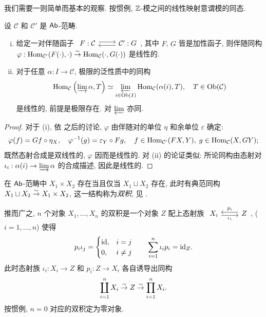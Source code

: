 我们需要一则简单而基本的观察. 按惯例, $\mathbb{Z}$-模之间的线性映射意谓模的同态.

\begin{proposition}\label{prop:automatic-Ab-morphism}
	设 $\mathcal{C}$ 和 $\mathcal{C}'$ 是 $\mathsf{Ab}$-范畴.
	\begin{enumerate}[(i)]
		\item 给定一对伴随函子
		$\begin{tikzcd}
			F: \mathcal{C} \arrow[shift left, r] & \mathcal{C}' \arrow[shift left, l] : G
		\end{tikzcd}$,
		其中 $F$, $G$ 皆是加性函子, 则伴随同构 $\varphi: \operatorname{Hom}_{\mathcal{C}'}(F(\cdot), \cdot) \stackrel{\sim}{\rightarrow} \operatorname{Hom}_{\mathcal{C}}(\cdot, G(\cdot))$ 是线性的.
		\item 对于任意 $\alpha: I \to \mathcal{C}$, 极限的泛性质中的同构
		\[ \operatorname{Hom}_{\mathcal{C}}\left( \varinjlim \alpha, T \right) \simeq \varprojlim_{i \in \operatorname{Ob}(I)} \operatorname{Hom}_{\mathcal{C}}(\alpha(i), T), \quad T \in \operatorname{Ob}(\mathcal{C}) \]
		是线性的, 前提是极限存在. 对 $\varprojlim$ 亦同.
	\end{enumerate}
\end{proposition}
\begin{proof}
	对于 (i), 依 \cite[定义 2.6.3]{Li1} 之后的讨论, $\varphi$ 由伴随对的单位 $\eta$ 和余单位 $\varepsilon$ 确定:
	\[ \varphi(f) = Gf \circ \eta_X, \quad \varphi^{-1}(g) = \varepsilon_Y \circ Fg, \quad f \in \operatorname{Hom}_{\mathcal{C}'}(FX, Y), \; g \in \operatorname{Hom}_{\mathcal{C}}(X, GY); \]
	既然态射合成是双线性的, $\varphi$ 因而是线性的. 对 (ii) 的论证类似: 所论同构由态射对 $\iota_i: \alpha(i) \to \varinjlim \alpha$ 的合成描述, 因此是线性的.
\end{proof}

在 $\mathsf{Ab}$-范畴中 $X_1 \times X_2$ 存在当且仅当 $X_1 \sqcup X_2$ 存在, 此时有典范同构 $X_1 \sqcup X_2 \stackrel{\sim}{\rightarrow} X_1 \times X_2$, 这一结构称为\emph{双积}, 见 \cite[定义 3.4.8, 定理 3.4.9]{Li1}.

推而广之, $n$ 个对象 $X_1, \ldots, X_n$ 的双积是一个对象 $Z$ 配上态射族
$\begin{tikzcd} X_i \arrow[r, yshift=-0.5ex, "\iota_i"'] & Z \arrow[l, yshift=0.5ex, "p_i"'] \end{tikzcd}$, ($i = 1, \ldots, n$) 使得
\begin{equation}\label{eqn:biproduct-identities}\begin{gathered}
	p_i \iota_j = \begin{cases} \mathrm{id}, & i=j \\ 0, & i \neq j \end{cases} \qquad
	\sum_{i=1}^n \iota_i p_i = \mathrm{id}_{Z}.
\end{gathered}\end{equation}
此时态射族 $\iota_i: X_i \to Z$ 和 $p_i: Z \to X_i$ 各自诱导出同构
\[ \coprod_{i=1}^n X_i \stackrel{\sim}{\rightarrow} Z \stackrel{\sim}{\rightarrow} \prod_{i=1}^n X_i. \]
按惯例, $n=0$ 对应的双积定为零对象.


